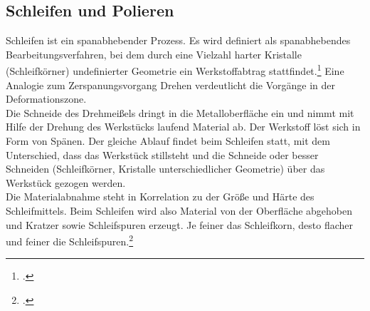 \documentclass[12pt,a4paper,parskip]{scrartcl}
\begin{document}
\subsection{Schleifen und Polieren}
Schleifen ist ein spanabhebender Prozess. Es wird definiert als spanabhebendes Bearbeitungsverfahren, bei dem durch eine Vielzahl harter Kristalle (Schleifkörner) undefinierter Geometrie ein Werkstoffabtrag stattfindet.\footcite[Vgl.][15]{hsp}  Eine Analogie zum Zerspanungsvorgang Drehen verdeutlicht die Vorgänge in der Deformationszone.\\
 Die Schneide des Drehmeißels dringt in die Metalloberfläche ein und nimmt mit Hilfe der Drehung des Werkstücks laufend Material ab. Der Werkstoff löst sich in Form von Spänen. Der gleiche Ablauf findet beim Schleifen statt, mit dem Unterschied, dass das Werkstück stillsteht und die Schneide oder besser Schneiden (Schleifkörner, Kristalle unterschiedlicher Geometrie) über das Werkstück gezogen werden.\\ Die Materialabnahme steht in Korrelation zu der Größe und Härte des Schleifmittels. Beim Schleifen wird also Material von der Oberfläche abgehoben und Kratzer sowie Schleifspuren erzeugt. Je feiner das Schleifkorn, desto flacher und feiner die Schleifspuren.\footcite[Vgl.][16-17]{hsp}\\  
\end{document}
